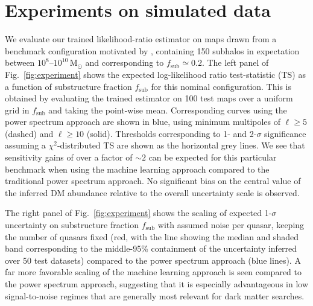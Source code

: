 \documentclass[twocolumn,linenumbers]{aastex631}
\begin{document}
\section{Experiments on simulated data}
\label{sec:experiments}

We evaluate our trained likelihood-ratio estimator on maps drawn from a benchmark configuration motivated by \citet{Hutten:2016jko,Springel:2008cc}, containing 150 subhalos in expectation between $10^{8}$--$10^{10}\,\mathrm{M}_\odot$ and corresponding to $f_\mathrm{sub} \simeq 0.2$. The left panel of Fig.~\ref{fig:experiment} shows the expected log-likelihood ratio test-statistic (TS) as a function of substructure fraction $f_\mathrm{sub}$ for this nominal configuration. This is obtained by evaluating the trained estimator on 100 test maps over a uniform grid in $f_\mathrm{sub}$ and taking the point-wise mean. Corresponding curves using the power spectrum approach are shown in blue, using minimum multipoles of $\ell \geq 5$ (dashed) and $\ell \geq 10$ (solid). Thresholds corresponding to 1- and 2-$\sigma$ significance assuming a $\chi^2$-distributed TS are shown as the horizontal grey lines. We see that sensitivity gains of over a factor of $\sim 2$ can be expected for this particular benchmark when using the machine learning approach compared to the traditional power spectrum approach. No significant bias on the central value of the inferred DM abundance relative to the overall uncertainty scale is observed.

The right panel of Fig.~\ref{fig:experiment} shows the scaling of expected 1-$\sigma$ uncertainty on substructure fraction $f_\mathrm{sub}$ with assumed noise per quasar, keeping the number of quasars fixed (red, with the line showing the median and shaded band corresponding to the middle-95\% containment of the uncertainty inferred over 50 test datasets) compared to the power spectrum approach (blue lines). A far more favorable scaling of the machine learning approach is seen compared to the power spectrum approach, suggesting that it is especially advantageous in low signal-to-noise regimes that are generally most relevant for dark matter searches.
\end{document}
